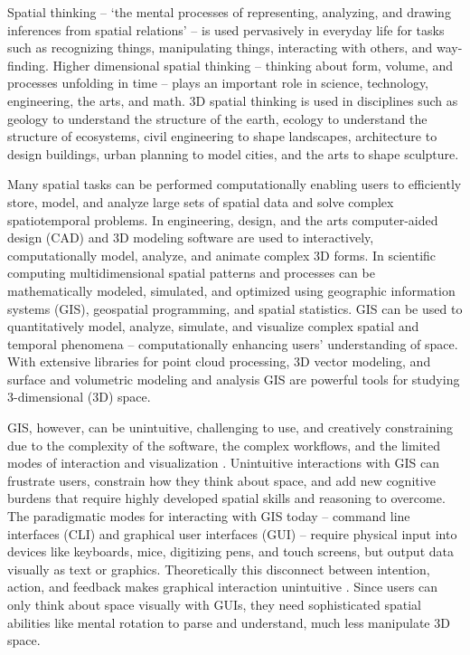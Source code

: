\documentclass[prodmode,acmtochi]{acmsmall} %
\begin{document}
Spatial thinking -- `the mental processes of representing, analyzing, and drawing inferences from spatial relations' \cite{Uttal2013} -- is used pervasively in everyday life for tasks such as recognizing things, manipulating things, interacting with others, and way-finding. 
% 
Higher dimensional spatial thinking 
-- thinking about form, volume, and processes unfolding in time -- 
plays an important role in 
science, technology, engineering, the arts, and math. 
%
3D spatial thinking is used in disciplines 
such as geology to understand the structure of the earth, 
ecology to understand the structure of ecosystems, 
civil engineering to shape landscapes, 
architecture to design buildings,
urban planning to model cities,
and the arts to shape sculpture.

Many spatial tasks can be performed computationally 
enabling users to efficiently store, model, and analyze large sets of spatial data 
and solve complex spatiotemporal problems.
%
In engineering, design, and the arts 
computer-aided design (CAD) and 3D modeling software are used 
to interactively, computationally model, analyze, and animate complex 3D forms.
%
In scientific computing
multidimensional spatial patterns and processes can be 
mathematically modeled, simulated, and optimized 
using geographic information systems (GIS), 
geospatial programming, and 
spatial statistics. 
%
GIS can be used to quantitatively model, analyze, simulate, and visualize 
complex spatial and temporal phenomena 
-- computationally enhancing users' understanding of space. 
%
With extensive libraries for point cloud processing, 
3D vector modeling, and
surface and volumetric modeling and analysis
GIS are powerful tools for studying 3-dimensional (3D) space.

GIS, however, can be unintuitive, challenging to use, and creatively constraining
due to the complexity of the software, 
the complex workflows, 
and the limited modes of interaction and visualization 
\cite{Ratti2004}. 
%
Unintuitive interactions with GIS can 
frustrate users,
constrain how they think about space, and add new cognitive burdens
that require highly developed spatial skills and reasoning to overcome. 
%
The paradigmatic modes for interacting with GIS today 
-- command line interfaces (CLI) and
graphical user interfaces (GUI) -- 
require physical input into devices like 
keyboards, mice, digitizing pens, and touch screens, 
but output data visually as text or graphics. 
%
Theoretically this disconnect between intention, action, and feedback 
makes graphical interaction unintuitive \cite{Dourish2001,Ishii2008}. 
%
Since users can only think about space visually with GUIs,
they need sophisticated spatial abilities 
like mental rotation \cite{Shepard1971,Just1985}
to parse and understand, much less manipulate 
3D space. %
\end{document}
